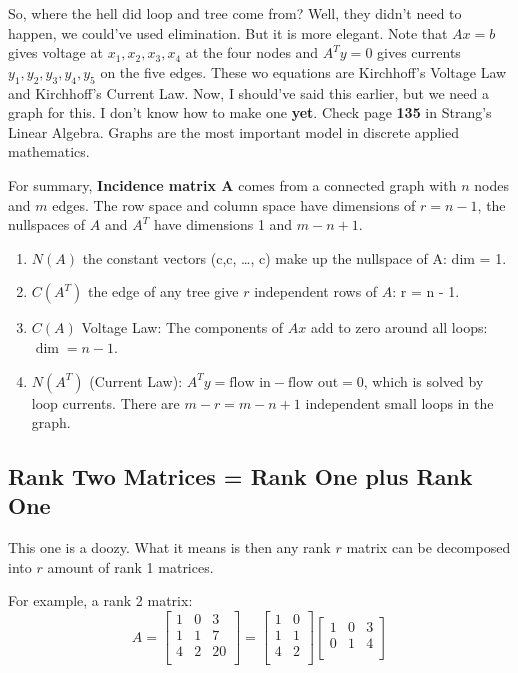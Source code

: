 So, where the hell did loop and tree come from? Well, they didn't need to happen, we could've used elimination. But it is more elegant. Note that \(Ax = b\) gives voltage at \(x_1, x_2, x_3, x_4\) at the four nodes and \(A^{T}y = 0 \) gives currents \(y_1, y_2, y_3, y_4, y_5\) on the five edges. These wo equations are Kirchhoff's Voltage Law and Kirchhoff's Current Law. Now, I should've said this earlier, but we need a graph for this. I don't know how to make one \textbf{yet}. Check page \textbf{135} in Strang's Linear Algebra. Graphs are the most important model in discrete applied mathematics. 


For summary, \textbf{Incidence matrix A} comes from a connected graph with \(n\) nodes and \(m\) edges. The row space and column space have dimensions of \(r = n - 1\), the nullspaces of \(A\) and \(A^T\) have dimensions 1 and \(m - n + 1\). 
\begin{enumerate}
    \item \(N(A)\) the constant vectors (c,c, \ldots, c) make up the nullspace of A: dim = 1.
    \item \(C(A^T)\)  the edge of any tree give \(r\) independent rows of \(A\): r = n - 1. 
    \item \(C(A)\) Voltage Law: The components of \(Ax\) add to zero around all loops: \(\dim = n - 1\). 
    \item \(N(A^T)\) (Current Law): \(A^{T} y = \text{flow in} - \text{flow out} = 0\), which is solved by loop currents. There are \(m - r = m - n + 1\) independent small loops in the graph.
\end{enumerate}    

\subsection{Rank Two Matrices = Rank One plus Rank One}

This one is a doozy. What it means is then any rank \(r\) matrix can be decomposed into \(r\) amount of rank 1 matrices. 

For example, a rank 2 matrix:
\[
    A = 
    \begin{bmatrix}
        1 & 0 & 3  \\
        1 & 1 & 7  \\
        4 & 2 & 20  \\
    \end{bmatrix}
    = 
    \begin{bmatrix}
        1 & 0  \\
        1 & 1  \\
        4 & 2  \\
    \end{bmatrix}
    \begin{bmatrix}
        1 & 0 & 3  \\
        0 & 1 & 4  \\
    \end{bmatrix}
\]

